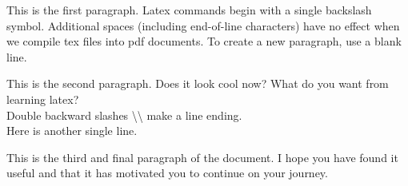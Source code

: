 \documentclass[12pt, a4paper]{article}
\begin{document}
This is the first paragraph.
Latex commands begin with a single backslash symbol.
Additional spaces (including end-of-line characters) have
no
effect
when we compile tex files into pdf documents.
To create a new paragraph, use a blank line.

This is the second paragraph. Does it look cool now? What do you want from learning latex?\\
Double backward slashes \textbackslash\textbackslash{} make a line ending.\\
Here is another single line.

This is the third and final paragraph of the document.
I hope you have found it useful and that it has motivated you to continue on your journey.

\end{document}
